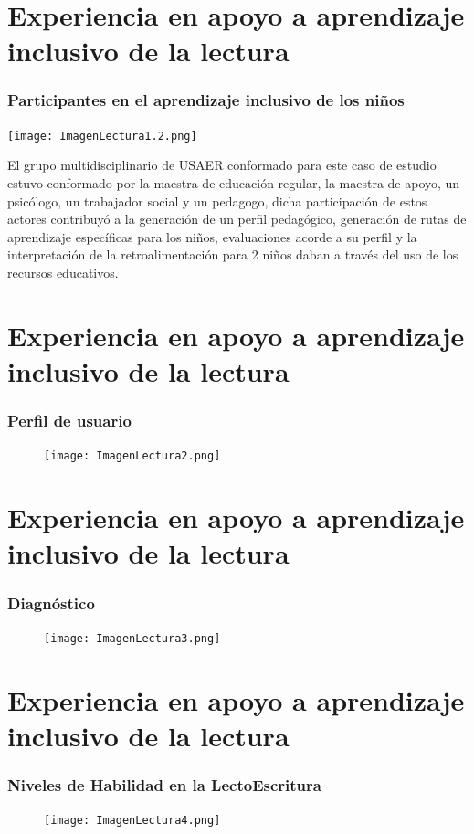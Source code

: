 \documentclass[11pt]{beamer}
\begin{document}
\section{Experiencia en apoyo a aprendizaje inclusivo de la lectura}
\begin{frame}
\frametitle{Participantes en el aprendizaje inclusivo de los niños}
    \justify
    \begin{minipage}[c]{0.4\textwidth} 
    \texttt{[image: ImagenLectura1.2.png]} 
    \end{minipage}
    \begin{minipage}[c]{0.55\textwidth}
        El grupo multidisciplinario de USAER conformado para este caso de estudio estuvo conformado por la maestra de educación regular, la maestra de apoyo, un psicólogo, un trabajador social y un pedagogo, dicha participación de estos actores contribuyó a la generación de un perfil pedagógico, generación de rutas de aprendizaje específicas para los niños, evaluaciones acorde a su  perfil y la interpretación de la retroalimentación para 2 niños daban a través del uso de los recursos educativos.
    \end{minipage}
\end{frame}

\section{Experiencia en apoyo a aprendizaje inclusivo de la lectura}
\begin{frame}
\frametitle{Perfil de usuario}
    \begin{figure}
    \centering
     \texttt{[image: ImagenLectura2.png]}
    \end{figure}
\end{frame}

\section{Experiencia en apoyo a aprendizaje inclusivo de la lectura}
\begin{frame}
\frametitle{Diagnóstico}
    \begin{figure}
    \centering
     \texttt{[image: ImagenLectura3.png]}
    \end{figure}
\end{frame}

\section{Experiencia en apoyo a aprendizaje inclusivo de la lectura}
\begin{frame}
\frametitle{Niveles de Habilidad en la LectoEscritura}
    \begin{figure}
    \centering
     \texttt{[image: ImagenLectura4.png]}
    \end{figure}
\end{frame}
\end{document}
